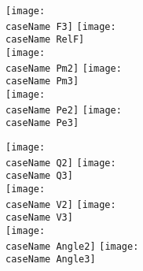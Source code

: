 \documentclass[12pt]{article}
\newcommand{\caseName}{ }
\begin{document}
	\texttt{[image: \\caseName F3]} %
	\texttt{[image: \\caseName RelF]} \\

	\texttt{[image: \\caseName Pm2]} %
	\texttt{[image: \\caseName Pm3]} \\

	\texttt{[image: \\caseName Pe2]} %
	\texttt{[image: \\caseName Pe3]} 
	
\pagebreak

	\texttt{[image: \\caseName Q2]} %
	\texttt{[image: \\caseName Q3]} \\

	\texttt{[image: \\caseName V2]} %
	\texttt{[image: \\caseName V3]} \\

	\texttt{[image: \\caseName Angle2]} %
	\texttt{[image: \\caseName Angle3]} 
\end{document}
